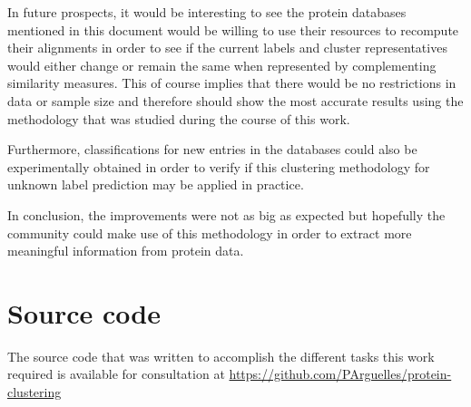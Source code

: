 In future prospects, it would be interesting to see the protein databases mentioned in this document would be willing to use their resources to recompute their alignments in order to see if the current labels and cluster representatives would either change or remain the same when represented by complementing similarity measures. This of course implies that there would be no restrictions in data or sample size and therefore should show the most accurate results using the methodology that was studied during the course of this work.

Furthermore, classifications for new entries in the databases could also be experimentally obtained in order to verify if this clustering methodology for unknown label prediction may be applied in practice.

In conclusion, the improvements were not as big as expected but hopefully the community could make use of this methodology in order to extract more meaningful information from protein data.


\section{Source code}

The source code that was written to accomplish the different tasks this work required is available for consultation at \url{https://github.com/PArguelles/protein-clustering} 
